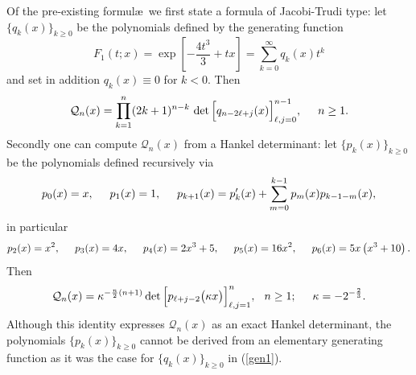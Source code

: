 \documentclass[10pt,oneside,reqno]{amsart}
\numberwithin{equation}{section}
\def\be{\begin{equation}}
\def\ee{\end{equation}}
\def\eqref#1{(\ref{#1})}
\begin{document}
Of the pre-existing formul\ae\ we first state a formula of Jacobi-Trudi type: let $\{q_k(x)\}_{k\geq 0}$ be the polynomials 
defined by the generating function
\be\label{gen1}
  F_1(t;x) = \exp\left[-\frac{4t^3}{3}+tx\right] = \sum_{k=0}^{\infty}q_k(x)t^k
\ee
and set in addition $q_k(x)\equiv 0$ for $k<0$. Then
\be\label{JT}
  \mathcal{Q}_n(x) = \prod_{k=1}^n(2k+1)^{n-k}\,\det\Big[q_{n-2\ell+j}(x)\Big]_{\ell,j=0}^{n-1},\hspace{0.5cm}n\geq 1.
\ee
Secondly one can compute $\mathcal{Q}_n(x)$ from a Hankel determinant: let $\{p_k(x)\}_{k\geq 0}$ be the polynomials defined recursively via
\be
  p_0(x)=x,\hspace{0.5cm} p_1(x)=1,\hspace{0.5cm}p_{k+1}(x) = p_k'(x) +\sum_{m=0}^{k-1}p_m(x)p_{k-1-m}(x),
\ee
in particular
\begin{equation*}
  p_2(x)=x^2,\hspace{0.5cm}p_3(x)=4x,\hspace{0.5cm}p_4(x)=2x^3+5,\hspace{0.5cm}p_5(x)=16x^2,\hspace{0.5cm}p_6(x)=5x\left(x^3+10\right).
\end{equation*}
Then
\be\label{H1}
  \mathcal{Q}_n(x) = \kappa^{-\frac{n}{2}(n+1)}\det\Big[p_{\ell+j-2}\big(\kappa x\big)\Big]_{\ell,j=1}^n,\hspace{0.25cm} n\geq 1;
  \hspace{0.5cm} \kappa=-2^{-\frac{2}{3}}.
\ee
Although this identity expresses $\mathcal{Q}_n(x)$ as an exact Hankel determinant, the polynomials $\{p_k(x)\}_{k\geq 0}$ cannot be derived from an elementary generating function
as it was the case for $\{q_k(x)\}_{k\geq 0}$ in \eqref{gen1}. 
\end{document}
